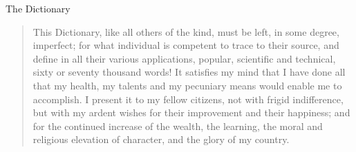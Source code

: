 \begin{texts}{The Dictionary}
\begin{quote}
    This Dictionary, like all others of the kind, must be left, in some degree, imperfect; for what individual is competent to trace to their source, and define in all their various applications, popular, scientific and technical, sixty or seventy thousand words! It satisfies my mind that I have done all that my health, my talents and my pecuniary means would enable me to accomplish. I present it to my fellow citizens, not with frigid indifference, but with my ardent wishes for their improvement and their happiness; and for the continued increase of the wealth, the learning, the moral and religious elevation of character, and the glory of my country.
\end{quote}


\end{texts}

